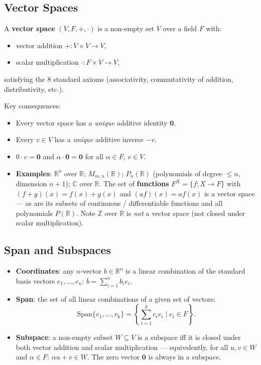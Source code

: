 \documentclass[hidelinks]{article}
\begin{document}
\subsection{Vector Spaces}
A \textbf{vector space} $(V, F, +, \cdot)$ is a non-empty set $V$ over a field $F$ with:
\begin{itemize}
    \item vector addition $+: V\times V \rightarrow V$,
    \item scalar multiplication $\cdot: F\times V \rightarrow V$,
\end{itemize}
satisfying the 8 standard axioms (associativity, commutativity of addition, distributivity, etc.).

Key consequences:
\begin{itemize}
    \item Every vector space has a \emph{unique} additive identity $\mathbf{0}$.
    \item Every $v\in V$ has a \emph{unique} additive inverse $-v$.
    \item $0 \cdot v = \mathbf{0}$ and $\alpha \cdot \mathbf{0} = \mathbf{0}$ for all $\alpha\in F$, $v\in V$.
    \item \textbf{Examples}: $\mathbb{R}^n$ over $\mathbb{R}$; $M_{m,n}(\mathbb{R})$; $P_n(\mathbb{R})$ (polynomials of degree $\le n$, dimension $n+1$); $\mathbb{C}$ over $\mathbb{R}$. The set of \textbf{functions} $F^X = \{f: X\to F\}$ with $(f+g)(x)=f(x)+g(x)$ and $(af)(x)=af(x)$ is a vector space — as are its subsets of continuous / differentiable functions and all polynomials $P(\mathbb{R})$. Note $\mathbb{Z}$ over $\mathbb{R}$ is \emph{not} a vector space (not closed under scalar multiplication).
\end{itemize}

\subsection{Span and Subspaces}
\begin{itemize}
    \item \textbf{Coordinates}: any $n$-vector $b\in\mathbb{R}^n$ is a linear combination of the standard basis vectors $e_1,\ldots,e_n$: $b = \sum_{i=1}^n b_i e_i$.
    \item \textbf{Span}: the set of all linear combinations of a given set of vectors:
    \[
        \mathrm{Span}\{v_1, \ldots, v_k\} = \left\{\sum_{i=1}^k c_i v_i \;\Big|\; c_i \in F\right\}.
    \]
    \item \textbf{Subspace}: a non-empty subset $W \subseteq V$ is a subspace iff it is closed under both vector addition and scalar multiplication — equivalently, for all $u, v \in W$ and $\alpha \in F$: $\alpha u + v \in W$. The zero vector $\mathbf{0}$ is always in a subspace.
\end{itemize}
\end{document}
